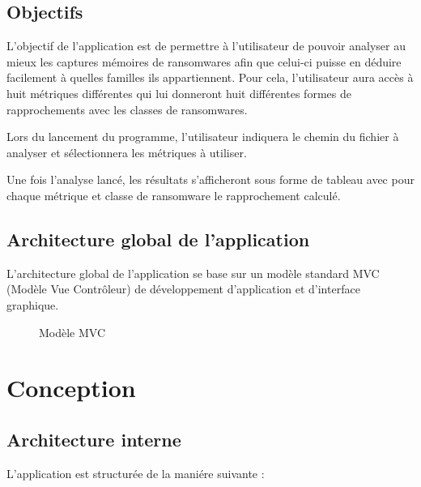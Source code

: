 \documentclass[a4paper, 12pt, twoside]{article}
\begin{document}
\subsection{Objectifs}
L'objectif de l'application est de permettre à l'utilisateur de pouvoir analyser au mieux les captures mémoires de ransomwares afin que celui-ci puisse en déduire facilement à quelles familles ils appartiennent. Pour cela, l'utilisateur aura accès à huit métriques différentes qui lui donneront huit différentes formes de rapprochements avec les classes de ransomwares.

Lors du lancement du programme, l'utilisateur indiquera le chemin 
du fichier à analyser et sélectionnera les métriques à utiliser.

Une fois l'analyse lancé, les résultats s'afficheront sous forme de tableau avec pour chaque métrique et classe de ransomware le rapprochement calculé.

\subsection{Architecture global de l'application}
L'architecture global de l'application se base sur un modèle standard MVC (Modèle Vue Contrôleur) de développement d'application et d'interface graphique.
\begin{figure}[!h]
\caption{Modèle MVC}
\end{figure}

\section{Conception}
\subsection{Architecture interne}
L'application est structurée de la maniére suivante :
\end{document}
